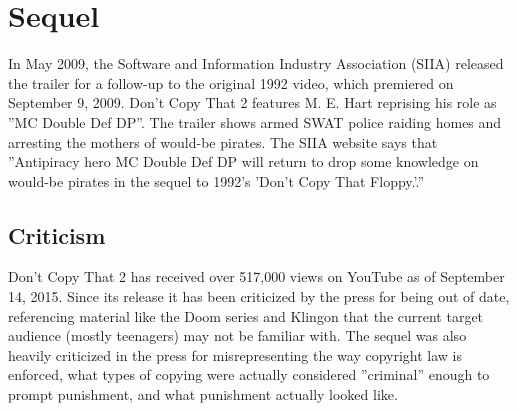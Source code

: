 
\chapter{Sequel}
\label{sequel}
In May 2009, the Software and Information Industry Association (SIIA) released the trailer for a follow-up to the original 1992 video, which premiered on September 9, 2009. Don't Copy That 2 features M. E. Hart reprising his role as ''MC Double Def DP''. The trailer shows armed SWAT police raiding homes and arresting the mothers of would-be pirates. The SIIA website says that ''Antipiracy hero MC Double Def DP will return to drop some knowledge on would-be pirates in the sequel to 1992's 'Don't Copy That Floppy.'.''

\section{Criticism}
Don't Copy That 2 has received over 517,000 views on YouTube as of September 14, 2015. Since its release it has been criticized by the press for being out of date, referencing material like the Doom series and Klingon that the current target audience (mostly teenagers) may not be familiar with. The sequel was also heavily criticized in the press for misrepresenting the way copyright law is enforced, what types of copying were actually considered ''criminal'' enough to prompt punishment, and what punishment actually looked like.